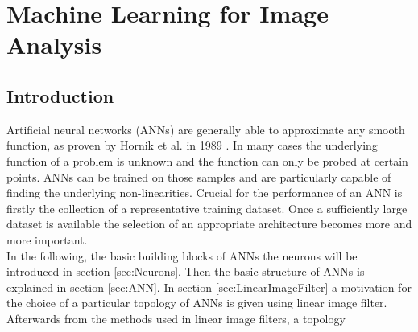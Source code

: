
\chapter{Machine Learning for Image Analysis} %

\label{CNN} %

\section{Introduction}

Artificial neural networks (ANNs) are generally able to approximate any smooth function, as proven by Hornik et al. in 1989 \cite{Hornik1989}. In many cases the underlying function of a problem is unknown and the function can only be probed at certain points. ANNs can be trained on those samples and are particularly capable of finding the underlying non-linearities. Crucial for the performance of an ANN is firstly the collection of a representative training dataset. Once a sufficiently large dataset is available the selection of an appropriate architecture becomes more and more important. \\

In the following, the basic building blocks of ANNs the neurons will be introduced in section \ref{sec:Neurons}. Then the basic structure of ANNs is explained in section \ref{sec:ANN}. In section \ref{sec:LinearImageFilter} a motivation for the choice of a particular topology of ANNs is given using linear image filter. Afterwards from the methods used in linear image filters, a topology 


